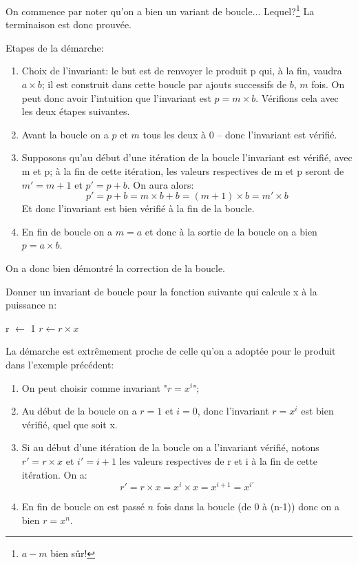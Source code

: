 \documentclass[12pt]{article}
\begin{document}
	On commence par noter qu'on a bien un variant de boucle... Lequel?\footnote{$a - m$ bien sûr!} La terminaison est donc prouvée.
	
	Etapes de la démarche:
	\begin{enumerate}
		\item Choix de l'invariant: le but est de renvoyer le produit p qui, à la fin, vaudra $a \times b$; il est construit dans cette boucle par ajouts successifs de $b$, $m$ fois. On peut donc avoir l'intuition que l'invariant est $p = m \times b$. Vérifions cela avec les deux étapes suivantes.
		\item Avant la boucle on a $p$ et $m$ tous les deux à 0 -- donc l'invariant est vérifié.
		\item Supposons qu'au début d'une itération de la boucle l'invariant est vérifié, avec m et p; à la fin de cette itération, les valeurs respectives de m et p seront de $m' = m + 1$ et $p' = p + b$.  On aura alors:
		\[ p' = p + b = m \times b + b = (m + 1) \times b = m' \times b\]
		Et donc l'invariant est bien vérifié à la fin de la boucle.
		\item En fin de boucle on a $m = a$ et donc à la sortie de la boucle on a bien $p = a \times b$.
	\end{enumerate}
	
	On a donc bien démontré la correction de la boucle.
	
	\begin{MonExo}
		Donner un invariant de boucle pour la fonction suivante qui calcule x à la puissance n:
		\begin{algorithmic}[1]
			\State r $\leftarrow$ 1
			\State $r \leftarrow r \times x$
			\EndFor
			\State{}
			\EndFunction
		\end{algorithmic}
	\end{MonExo}
	
	\begin{MaReponse}
		La démarche est extrêmement proche de celle qu'on a adoptée pour le produit dans l'exemple précédent:
		\begin{enumerate}
			\item On peut choisir comme invariant "$r = x^i$";
			\item Au début de la boucle on a $r = 1$ et $i = 0$, donc l'invariant $r = x^i$ est bien vérifié, quel que soit x.
			\item Si au début d'une itération de la boucle on a l'invariant vérifié, notons $r' = r \times x$ et $i' = i + 1$ les valeurs respectives de r et i à la fin de cette itération. On a:
			\[ r' = r \times x = x^i \times x = x^{i+1} = x^{i'}\]
			\item En fin de boucle on est passé $n$ fois dans la boucle (de 0 à (n-1)) donc on a bien $r = x^n$.
		\end{enumerate}
	\end{MaReponse}
\end{document}
